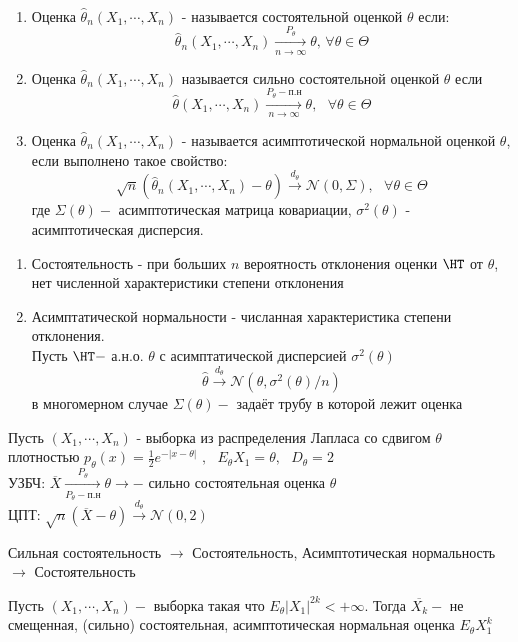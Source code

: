 \documentclass[11pt,fleqn]{book} %
\def\t{\theta}
\def\T{\Theta}
\def\H{\hat{\theta}}
\def\X{(X_1, \cdots, X_n)}
\def\s{\textit{  }}
\def\DT{\xrightarrow[] {d_\theta}}
\def\PPT{\xrightarrow[P_\theta - \textit{п.н}] {P_\theta}}
\begin{document}
\begin{defi}
\label{def_as_property}
\\

\begin{enumerate}
\item Оценка $\hat{\theta}_n(X_1, \cdots, X_n)$ - называется состоятельной оценкой $\theta$ если: $$\hat{\theta}_n(X_1, \cdots, X_n) \xrightarrow[n \rightarrow \infty]{P_\theta} \theta \textbf{,  }\forall \theta \in \Theta $$
\item Оценка $\hat{\theta}_n(X_1, \cdots, X_n)$ называется сильно состоятельной оценкой $\theta$ если $$\hat{\theta}(X_1, \cdots, X_n) \xrightarrow[n \rightarrow \infty] {P_\theta - \textit{п.н}}  \theta ,\s \forall \t \in \T$$
\item Оценка $\H_n \X$ - называется асимптотической нормальной оценкой $\t$, если выполнено такое свойство: $$\sqrt{n}(\H_n \X - \t)  \DT \mathcal{N}(0,\Sigma) ,\s \forall \t \in \T $$ где $\Sigma(\t) - $ асимптотическая матрица ковариации, $\sigma^2(\t)$ - асимптотическая дисперсия.  
\end{enumerate}
\end{defi}
\begin{coro}
\begin{enumerate}
\item Состоятельность - при больших $n$ вероятность отклонения оценки $\HT$ от $\t$, нет численной характеристики степени отклонения 
\item Асимптатической нормальности  - числанная характеристика степени отклонения. \\ Пусть  $\HT - $ а.н.о. $\t$ с асимптатической дисперсией $\sigma^2(\t)$ $$\H \DT \mathcal{N}(\t, \sigma^2(\t) / n)$$ в многомерном случае $\Sigma(\t) - $ задаёт трубу в которой лежит оценка 
\end{enumerate}

\end{coro}

\begin{exa}
Пусть $\X$ - выборка из распределения Лапласа со сдвигом $\t$ плотностью $p_\t(x) = \frac{1}{2} e^{-|x-\t|}$ $,\s E_\t X_1= \t, \s D_\t = 2$\\ УЗБЧ: $\overline{X} \PPT \t \rightarrow - $ сильно состоятельная оценка $\t$  \\ ЦПТ: $\sqrt{n} (\overline{X} - \t) \DT \mathcal{N}(0,2)$ 
\end{exa}

\begin{proposition} Сильная состоятельность $\rightarrow$ Состоятельность, Асимптотическая нормальность $\rightarrow$ Состоятельность
\end{proposition}
\begin{proposition}
Пусть $\X - $ выборка такая что $E_\t |X_1|^{2k} < + \infty$. Тогда $\overline{X_k} - $ не смещенная, (сильно) состоятельная, асимптотическая нормальная оценка $E_\t X_1^k$ 
\end{proposition}
\end{document}
